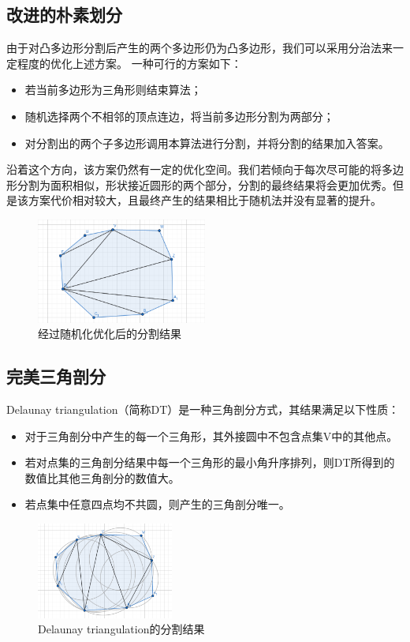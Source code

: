 \subsection{改进的朴素划分}

由于对凸多边形分割后产生的两个多边形仍为凸多边形，我们可以采用分治法来一定程度的优化上述方案。
一种可行的方案如下：
\begin{itemize}
    \item 若当前多边形为三角形则结束算法；
    \item 随机选择两个不相邻的顶点连边，将当前多边形分割为两部分；
    \item 对分割出的两个子多边形调用本算法进行分割，并将分割的结果加入答案。
\end{itemize}

沿着这个方向，该方案仍然有一定的优化空间。我们若倾向于每次尽可能的将多边形分割为面积相似，形状接近圆形的两个部分，分割的最终结果将会更加优秀。但是该方案代价相对较大，且最终产生的结果相比于随机法并没有显著的提升。

\begin{figure}[htp]
    \centering
    \includegraphics[width=0.5\textwidth]
    {figures/random.png}
    \caption{经过随机化优化后的分割结果}
  \end{figure}

\subsection{完美三角剖分}
Delaunay triangulation（简称DT）是一种三角剖分方式，其结果满足以下性质：
\begin{itemize}
    \item 对于三角剖分中产生的每一个三角形，其外接圆中不包含点集V中的其他点。
    \item 若对点集的三角剖分结果中每一个三角形的最小角升序排列，则DT所得到的数值比其他三角剖分的数值大。
    \item 若点集中任意四点均不共圆，则产生的三角剖分唯一。
\end{itemize}

\begin{figure}[htbp]
    \centering
    \includegraphics[width=0.4\textwidth]
    {figures/triangulation-1.png}
    \caption{Delaunay triangulation的分割结果}
\end{figure}

